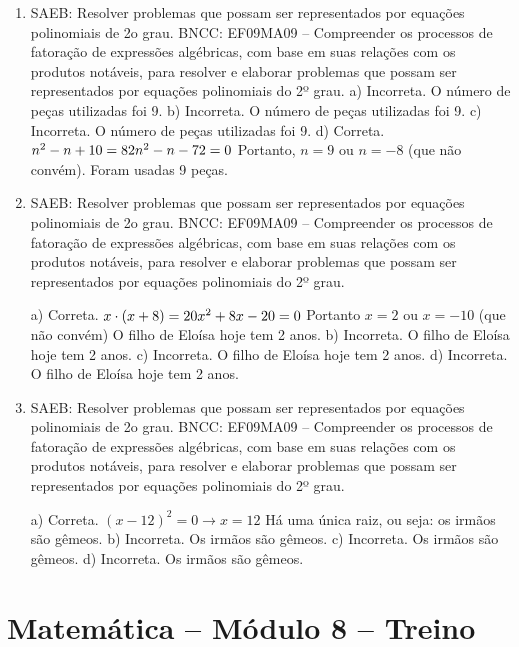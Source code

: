 \begin{enumerate}
\item
SAEB: Resolver problemas que possam ser representados por equações
polinomiais de 2o grau.
BNCC: EF09MA09 -- Compreender os processos de fatoração de expressões 
algébricas, com base em suas relações com os produtos notáveis, para resolver 
e elaborar problemas que possam ser representados por equações polinomiais do 
2º grau.
a) Incorreta. O número de peças utilizadas foi 9.
b) Incorreta. O número de peças utilizadas foi 9.
c) Incorreta. O número de peças utilizadas foi 9.
d) Correta. $n^2 - n + 10 = 82 \\ 
n^2 - n - 72 = 0$
Portanto, $n = 9$ ou $n = - 8$ (que não convém). 
Foram usadas 9 peças.

\item
SAEB: Resolver problemas que possam ser representados por equações polinomiais de 2o grau.
BNCC: EF09MA09 -- Compreender os processos de fatoração de expressões 
algébricas, com base em suas relações com os produtos notáveis, para resolver 
e elaborar problemas que possam ser representados por equações polinomiais do 
2º grau.

a) Correta. $x \cdot (x + 8) = 20 \\
x^2 + 8x - 20 = 0$
Portanto $x = 2$ ou $x = - 10$ (que não convém)
O filho de Eloísa hoje tem 2 anos. 
b) Incorreta. O filho de Eloísa hoje tem 2 anos. 
c) Incorreta. O filho de Eloísa hoje tem 2 anos. 
d) Incorreta. O filho de Eloísa hoje tem 2 anos.

\item
SAEB: Resolver problemas que possam ser representados por equações polinomiais de 2o grau.
BNCC: EF09MA09 -- Compreender os processos de fatoração de expressões 
algébricas, com base em suas relações com os produtos notáveis, para resolver 
e elaborar problemas que possam ser representados por equações polinomiais do 
2º grau.

a) Correta. $(x - 12)^2 = 0 \rightarrow x = 12$ Há uma única raiz, ou seja:
os irmãos são gêmeos.
b) Incorreta. Os irmãos são gêmeos.
c) Incorreta. Os irmãos são gêmeos.
d) Incorreta. Os irmãos são gêmeos.
\end{enumerate}

\section*{Matemática – Módulo 8 – Treino}


